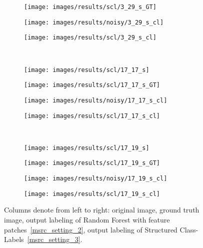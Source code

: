 \begin{figure}[t]
\begin{subfigure}[c]{0.24\textwidth}
  \centering
  \texttt{[image: images/results/scl/3\_29\_s\_GT]}
 \end{subfigure}
 \begin{subfigure}[c]{0.24\textwidth}
  \centering
  \texttt{[image: images/results/noisy/3\_29\_s\_cl]}
 \end{subfigure}
 \begin{subfigure}[c]{0.24\textwidth}
  \centering
  \texttt{[image: images/results/scl/3\_29\_s\_cl]}
 \end{subfigure}
 \\
 \begin{subfigure}[c]{0.24\textwidth}
  \centering
  \texttt{[image: images/results/scl/17\_17\_s]}
 \end{subfigure}
 \begin{subfigure}[c]{0.24\textwidth}
  \centering
  \texttt{[image: images/results/scl/17\_17\_s\_GT]}
 \end{subfigure}
 \begin{subfigure}[c]{0.24\textwidth}
  \centering
  \texttt{[image: images/results/noisy/17\_17\_s\_cl]}
 \end{subfigure}
 \begin{subfigure}[c]{0.24\textwidth}
  \centering
  \texttt{[image: images/results/scl/17\_17\_s\_cl]}
 \end{subfigure}
 \\
 \begin{subfigure}[c]{0.24\textwidth}
  \centering
  \texttt{[image: images/results/scl/17\_19\_s]}
 \end{subfigure}
 \begin{subfigure}[c]{0.24\textwidth}
  \centering
  \texttt{[image: images/results/scl/17\_19\_s\_GT]}
 \end{subfigure}
 \begin{subfigure}[c]{0.24\textwidth}
  \centering
  \texttt{[image: images/results/noisy/17\_19\_s\_cl]}
 \end{subfigure}
 \begin{subfigure}[c]{0.24\textwidth}
  \centering
  \texttt{[image: images/results/scl/17\_19\_s\_cl]}
 \end{subfigure}
 \caption{Columns denote from left to right: original image, ground truth image, output labeling of Random Forest with feature patches~\ref{msrc_setting_2},
 output labeling of Structured Class-Labels~\ref{msrc_setting_3}.}\label{fig:msrc_scl}
\end{figure}

